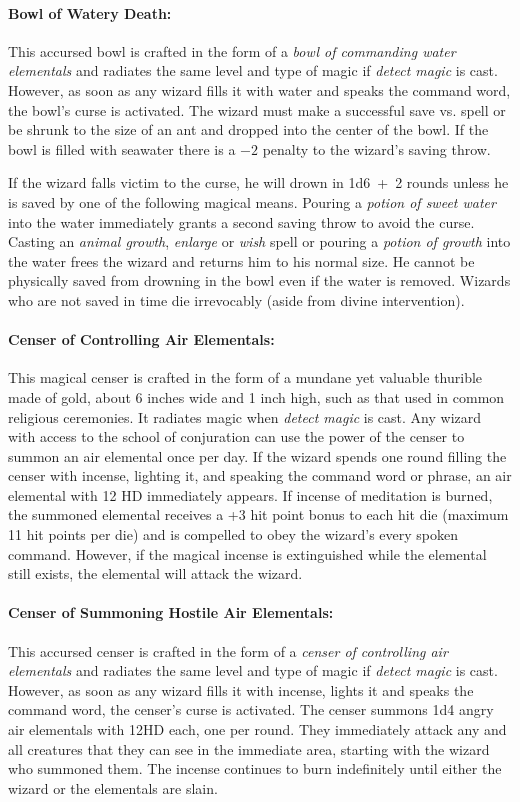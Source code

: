 \begin{multicols}{2}
\paragraph{Bowl of Watery Death:} This accursed bowl is crafted in the form of a \textit{bowl of commanding water elementals} and radiates the same level and type of magic if \textit{detect magic} is cast.  However, as soon as any wizard fills it with water and speaks the command word, the bowl's curse is activated.  The wizard must make a successful save vs. spell or be shrunk to the size of an ant and dropped into the center of the bowl.  If the bowl is filled with seawater there is a $-2$ penalty to the wizard's saving throw.
 
If the wizard falls victim to the curse, he will drown in 1d6~+~2 rounds unless he is saved by one of the following magical means.  Pouring a \textit{potion of sweet water} into the water immediately grants a second saving throw to avoid the curse.  Casting an \textit{animal growth}, \textit{enlarge} or \textit{wish} spell or pouring a \textit{potion of growth} into the water frees the wizard and returns him to his normal size.  He cannot be physically saved from drowning in the bowl even if the water is removed.  Wizards who are not saved in time die irrevocably (aside from divine intervention).

\paragraph{Censer of Controlling Air Elementals:} This magical censer is crafted in the form of a mundane yet valuable thurible made of gold, about 6 inches wide and 1 inch high, such as that used in common religious ceremonies.  It radiates magic when \textit{detect magic} is cast.  Any wizard with access to the school of conjuration can use the power of the censer to summon an air elemental once per day.  If the wizard spends one round filling the censer with incense, lighting it, and speaking the command word or phrase, an air elemental with 12 HD immediately appears.  If incense of meditation is burned, the summoned elemental receives a +3 hit point bonus to each hit die (maximum 11 hit points per die) and is compelled to obey the wizard's every spoken command.  However, if the magical incense is extinguished while the elemental still exists, the elemental will attack the wizard.

\paragraph{Censer of Summoning Hostile Air Elementals:} This accursed censer is crafted in the form of a \textit{censer of controlling air elementals} and radiates the same level and type of magic if \textit{detect magic} is cast.  However, as soon as any wizard fills it with incense, lights it and speaks the command word, the censer's curse is activated.  The censer summons 1d4 angry air elementals with 12HD each, one per round.  They immediately attack any and all creatures that they can see in the immediate area, starting with the wizard who summoned them.  The incense continues to burn indefinitely until either the wizard or the elementals are slain.
 

\end{multicols}
